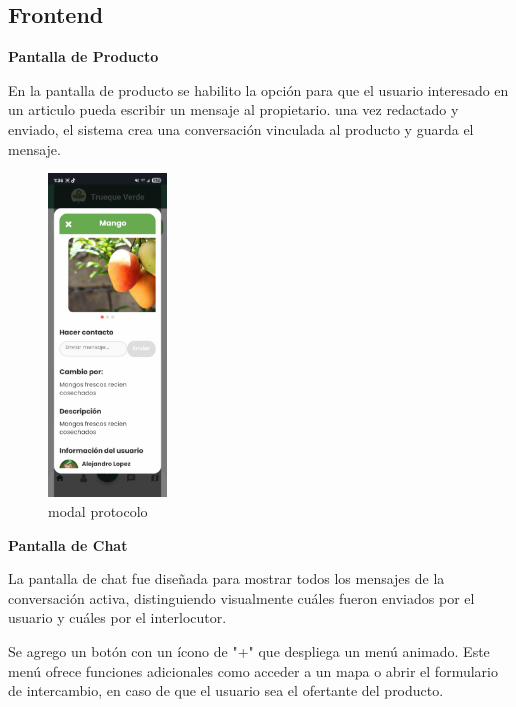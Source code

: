 \documentclass[11pt, a4paper, oneside]{book}
\begin{document}
   \subsection{Frontend}
   
   \textbf{Pantalla de Producto} 
   
   
   En la pantalla de producto se habilito la opción para que el usuario interesado en un articulo pueda escribir un mensaje al propietario. una vez redactado y enviado, el sistema crea una conversación vinculada al producto y guarda el mensaje.

    
\begin{figure}[H]
 \centering
 \includegraphics[width=0.28\textwidth]{Pictures/1.png}
          \caption{modal protocolo}
 
  \end{figure}


        \textbf{Pantalla de Chat}

La pantalla de chat fue diseñada para mostrar todos los mensajes de la conversación activa, distinguiendo visualmente cuáles fueron enviados por el usuario y cuáles por el interlocutor.



Se agrego un botón con un ícono de "+" que despliega un menú animado. Este menú ofrece funciones adicionales como acceder a un mapa o abrir el formulario de intercambio, en caso de que el usuario sea el ofertante del producto.
\end{document}
